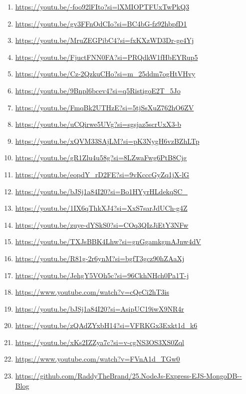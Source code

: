 \documentclass[12pt]{article}
\begin{document}
\begin{enumerate}[label=\arabic*.,itemsep=0pt,parsep=0pt]

      \item \url{https://youtu.be/-foo92lFIto?si=lXMIOPTFUxTwPkQ3}
      \item \url{https://youtu.be/gv3FFnOdCIo?si=BC4bG-fz92hbpfD1}
      \item \url{https://youtu.be/MruZEGPibC4?si=fxKXzWD3Dr-ge4Yj}
      \item \url{https://youtu.be/FjuctFNN0FA?si=PRQdkW1fHbEYRup5}
      \item \url{https://youtu.be/Cz-2QzkuCHo?si=m_25ddm7ogHtVHvy}
      \item \url{https://youtu.be/9Bnpl6bcev4?si=q5RistigoE2T_5Jo}
      \item \url{https://youtu.be/FmqBk2UTHzE?si=5tjSsXuZ762hO6ZV}
      \item \url{https://youtu.be/uCQirwe5UVg?si=sgsjaz5scrUxX3-b}
      \item \url{https://youtu.be/xQVM33SAjLM?si=pK3NygH6vzBZhLTp}
      \item \url{https://youtu.be/gR1Zlu4u58g?si=8LZwaFwg6PtB8Cjg}
      \item \url{https://youtu.be/eopdY_rD2FE?si=9vKcccGyZq1jX-lG}
      \item \url{https://youtu.be/bJSj1a84I20?si=Bo1HYyrHLdekqSC_}
      \item \url{https://youtu.be/1IX6qThkXJ4?si=XxS7sarJdUCh-g4Z}
      \item \url{https://youtu.be/zuye-dYSkS0?si=COq3QIzJiEtY3NFw}
      \item \url{https://youtu.be/TXJsBBK4Lhw?si=gnGgamkgmAJnw4dV}
      \item \url{https://youtu.be/R81g-2r6ynM?si=bgfT3gcz90hZAaXj}
      \item \url{https://youtu.be/JehgY5VOh5c?si=96CkhNHch0Pa1T-j}
      \item \url{https://www.youtube.com/watch?v=cQeCi2hT3is}
      \item \url{https://youtu.be/bJSj1a84I20?si=AsipUC19iwX9NR4r}
      \item \url{https://youtu.be/zQAdZYxbH14?si=VFRKGx3Exkt1d_k6}
      \item \url{https://youtu.be/xKs2IZZya7c?si=v-cgNS3OS3XS0Zql}
      \item \url{https://www.youtube.com/watch?v=FVnA1d_TGw0}
      \item \url{https://github.com/RaddyTheBrand/25.NodeJs-Express-EJS-MongoDB--Blog}

\end{enumerate}
\end{document}
